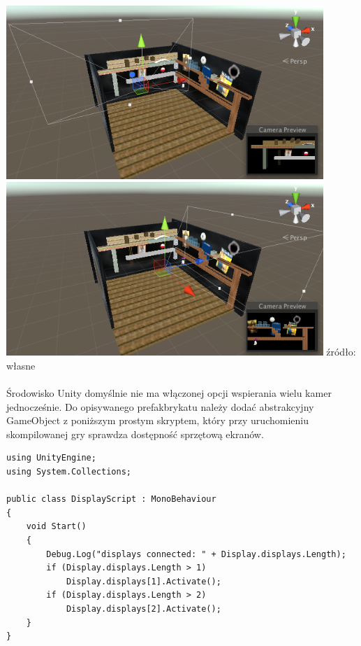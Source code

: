 \begin{center}
\includegraphics[width=0.9\textwidth]{images/kamera1.png}
\includegraphics[width=0.9\textwidth]{images/kamera2.png}
\small {źródło: własne }
\end{center}

\paragraph{}
Środowisko Unity domyślnie nie ma włączonej opcji wspierania wielu kamer jednocześnie. Do opisywanego prefakbrykatu należy dodać abstrakcyjny GameObject z poniższym prostym skryptem, który przy uruchomieniu skompilowanej gry sprawdza dostępność sprzętową ekranów.

\begin{lstlisting}[language=CSharp]
using UnityEngine;
using System.Collections;

public class DisplayScript : MonoBehaviour
{
	void Start()
	{
		Debug.Log("displays connected: " + Display.displays.Length);
		if (Display.displays.Length > 1)
			Display.displays[1].Activate();
		if (Display.displays.Length > 2)
			Display.displays[2].Activate();
	}
}
\end{lstlisting}

